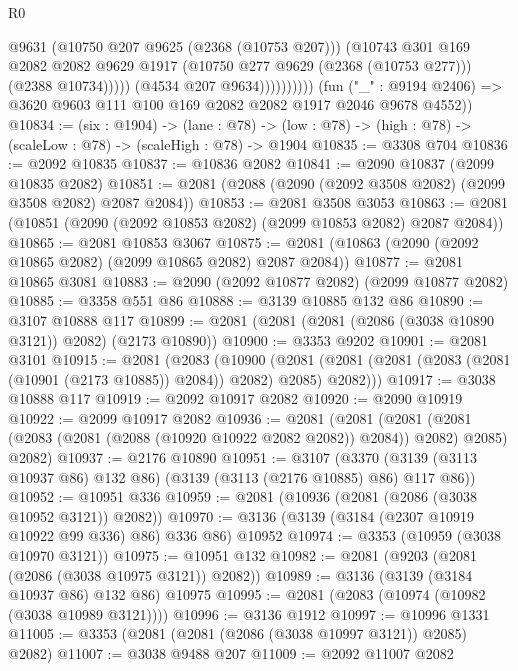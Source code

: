 \begin{lexlean}{R0}
\begin{coremodule}
                              @9631
                              (@10750 @207 @9625 (@2368 (@10753 @207)))
                              (@10743
                                @301
                                @169
                                @2082
                                @2082
                                @9629
                                @1917
                                (@10750 @277 @9629 (@2368 (@10753 @277)))
                                (@2388 @10734)))))
                        (@4534 @207 @9634))))))))))
      (fun ("_" : @9194 @2406) => @3620 @9603 @111 @100 @169 @2082 @2082 @1917 @2046 @9678 @4552))
@10834 := (six : @1904) ->
  (lane : @78) -> (low : @78) -> (high : @78) -> (scaleLow : @78) -> (scaleHigh : @78) -> @1904
@10835 := @3308 @704
@10836 := @2092 @10835
@10837 := @10836 @2082
@10841 := @2090 @10837 (@2099 @10835 @2082)
@10851 := @2081 (@2088 (@2090 (@2092 @3508 @2082) (@2099 @3508 @2082) @2087 @2084))
@10853 := @2081 @3508 @3053
@10863 := @2081 (@10851 (@2090 (@2092 @10853 @2082) (@2099 @10853 @2082) @2087 @2084))
@10865 := @2081 @10853 @3067
@10875 := @2081 (@10863 (@2090 (@2092 @10865 @2082) (@2099 @10865 @2082) @2087 @2084))
@10877 := @2081 @10865 @3081
@10883 := @2090 (@2092 @10877 @2082) (@2099 @10877 @2082)
@10885 := @3358 @551 @86
@10888 := @3139 @10885 @132 @86
@10890 := @3107 @10888 @117
@10899 := @2081 (@2081 (@2081 (@2086 (@3038 @10890 @3121)) @2082) (@2173 @10890))
@10900 := @3353 @9202
@10901 := @2081 @3101
@10915 := @2081
    (@2083
      (@10900
        (@2081 (@2081 (@2081 (@2083 (@2081 (@10901 (@2173 @10885)) @2084)) @2082) @2085) @2082)))
@10917 := @3038 @10888 @117
@10919 := @2092 @10917 @2082
@10920 := @2090 @10919
@10922 := @2099 @10917 @2082
@10936 := @2081
    (@2081
      (@2081 (@2081 (@2083 (@2081 (@2088 (@10920 @10922 @2082 @2082)) @2084)) @2082) @2085)
      @2082)
@10937 := @2176 @10890
@10951 := @3107
    (@3370 (@3139 (@3113 @10937 @86) @132 @86) (@3139 (@3113 (@2176 @10885) @86) @117 @86))
@10952 := @10951 @336
@10959 := @2081 (@10936 (@2081 (@2086 (@3038 @10952 @3121)) @2082))
@10970 := @3136 (@3139 (@3184 (@2307 @10919 @10922 @99 @336) @86) @336 @86) @10952
@10974 := @3353 (@10959 (@3038 @10970 @3121))
@10975 := @10951 @132
@10982 := @2081 (@9203 (@2081 (@2086 (@3038 @10975 @3121)) @2082))
@10989 := @3136 (@3139 (@3184 @10937 @86) @132 @86) @10975
@10995 := @2081 (@2083 (@10974 (@10982 (@3038 @10989 @3121))))
@10996 := @3136 @1912
@10997 := @10996 @1331
@11005 := @3353 (@2081 (@2081 (@2086 (@3038 @10997 @3121)) @2085) @2082)
@11007 := @3038 @9488 @207
@11009 := @2092 @11007 @2082

\end{coremodule}
\end{lexlean}
